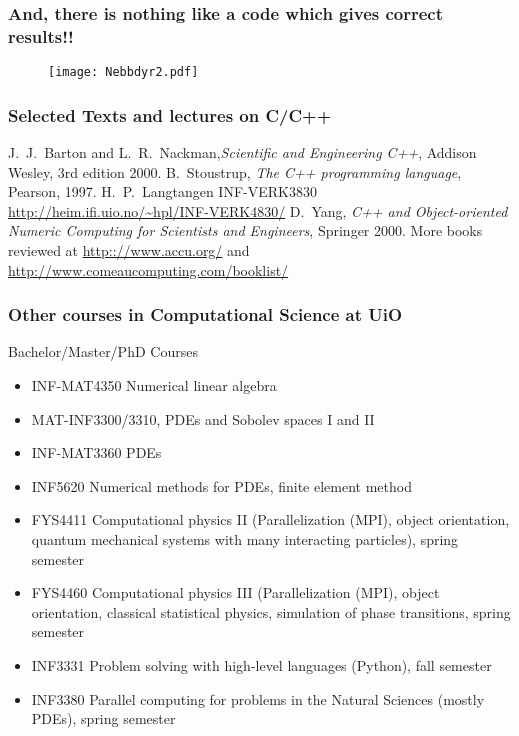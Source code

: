 \documentclass[compress]{beamer}
\begin{document}
\frame
{
  \frametitle{And, there is nothing like a code which gives correct results!!}
\vspace{-10cm}
\begin{figure}
\texttt{[image: Nebbdyr2.pdf]}
\end{figure}
}


\frame
{
  \frametitle<presentation>{Selected Texts and lectures on C/C++}
 \begin{small}
 {\scriptsize

  \beamertemplatebookbibitems

  \begin{thebibliography}{10}
    J.~J.~Barton and L.~R.~Nackman,{\em Scientific and Engineering C++}, Addison Wesley, 3rd edition 2000.
    B.~Stoustrup, {\em The C++ programming language}, Pearson, 1997.
    H.~P.~Langtangen INF-VERK3830 \url{http://heim.ifi.uio.no/~hpl/INF-VERK4830/}
    D.~Yang, {\em C++ and Object-oriented Numeric Computing for
Scientists and Engineers}, Springer 2000.
 More books reviewed at \url{http:://www.accu.org/} and
\url{http://www.comeaucomputing.com/booklist/}
\end{thebibliography}
 }
 \end{small}
}



\frame
{
  \frametitle{Other courses in Computational Science at UiO}
  \begin{block}{Bachelor/Master/PhD Courses}
\begin{itemize}
\item INF-MAT4350 Numerical linear algebra
\item MAT-INF3300/3310, PDEs and Sobolev spaces I and II
\item INF-MAT3360 PDEs
\item INF5620 Numerical methods for PDEs, finite element method
\item FYS4411 Computational physics II (Parallelization (MPI), object orientation,
quantum mechanical
systems with many interacting particles), spring semester
\item FYS4460 Computational physics III (Parallelization (MPI), object orientation,
classical statistical physics, simulation of phase transitions, spring semester
\item INF3331 Problem solving with high-level languages (Python), fall semester
\item INF3380 Parallel computing for problems in the Natural Sciences (mostly PDEs), spring semester
\end{itemize}
  \end{block}
}
\end{document}
